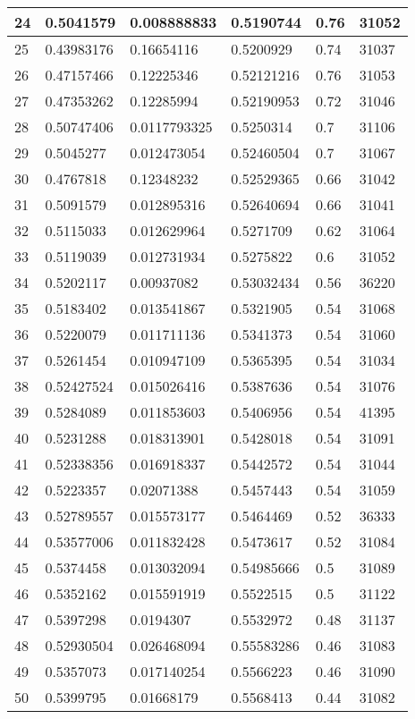 \begin{longtable}{|l|l|l|l|l|l|}
24 & 0.5041579 & 0.008888833 & 0.5190744 & 0.76 & 31052 \\ \hline 
25 & 0.43983176 & 0.16654116 & 0.5200929 & 0.74 & 31037 \\ \hline 
26 & 0.47157466 & 0.12225346 & 0.52121216 & 0.76 & 31053 \\ \hline 
27 & 0.47353262 & 0.12285994 & 0.52190953 & 0.72 & 31046 \\ \hline 
28 & 0.50747406 & 0.0117793325 & 0.5250314 & 0.7 & 31106 \\ \hline 
29 & 0.5045277 & 0.012473054 & 0.52460504 & 0.7 & 31067 \\ \hline 
30 & 0.4767818 & 0.12348232 & 0.52529365 & 0.66 & 31042 \\ \hline 
31 & 0.5091579 & 0.012895316 & 0.52640694 & 0.66 & 31041 \\ \hline 
32 & 0.5115033 & 0.012629964 & 0.5271709 & 0.62 & 31064 \\ \hline 
33 & 0.5119039 & 0.012731934 & 0.5275822 & 0.6 & 31052 \\ \hline 
34 & 0.5202117 & 0.00937082 & 0.53032434 & 0.56 & 36220 \\ \hline 
35 & 0.5183402 & 0.013541867 & 0.5321905 & 0.54 & 31068 \\ \hline 
36 & 0.5220079 & 0.011711136 & 0.5341373 & 0.54 & 31060 \\ \hline 
37 & 0.5261454 & 0.010947109 & 0.5365395 & 0.54 & 31034 \\ \hline 
38 & 0.52427524 & 0.015026416 & 0.5387636 & 0.54 & 31076 \\ \hline 
39 & 0.5284089 & 0.011853603 & 0.5406956 & 0.54 & 41395 \\ \hline 
40 & 0.5231288 & 0.018313901 & 0.5428018 & 0.54 & 31091 \\ \hline 
41 & 0.52338356 & 0.016918337 & 0.5442572 & 0.54 & 31044 \\ \hline 
42 & 0.5223357 & 0.02071388 & 0.5457443 & 0.54 & 31059 \\ \hline 
43 & 0.52789557 & 0.015573177 & 0.5464469 & 0.52 & 36333 \\ \hline 
44 & 0.53577006 & 0.011832428 & 0.5473617 & 0.52 & 31084 \\ \hline 
45 & 0.5374458 & 0.013032094 & 0.54985666 & 0.5 & 31089 \\ \hline 
46 & 0.5352162 & 0.015591919 & 0.5522515 & 0.5 & 31122 \\ \hline 
47 & 0.5397298 & 0.0194307 & 0.5532972 & 0.48 & 31137 \\ \hline 
48 & 0.52930504 & 0.026468094 & 0.55583286 & 0.46 & 31083 \\ \hline 
49 & 0.5357073 & 0.017140254 & 0.5566223 & 0.46 & 31090 \\ \hline 
50 & 0.5399795 & 0.01668179 & 0.5568413 & 0.44 & 31082 \\ \hline 
\end{longtable}